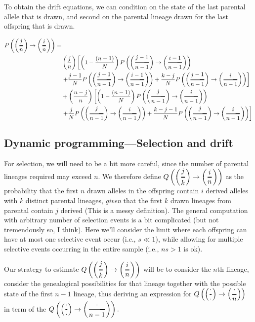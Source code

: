 \documentclass[]{article}
\newcommand{\Dfrac}[2]{%
  \ooalign{%
    $\left(\genfrac{}{}{1.2pt}0{#1}{#2}\right)$\cr%
    $\color{white}\genfrac{}{}{.4pt}0{\phantom{#1}}{\phantom{#2}}$}%
}
\begin{document}
To obtain the drift equations, we can condition on the state of the last parental allele that is drawn, and second on the parental lineage drawn for the last offspring that is drawn. 

\begin{equation}
\begin{split}
 P\left(\Dfrac{j}{n} \rightarrow \Dfrac{i}{n} \right) =&\\& \left(\frac{j}{n}\right)\left[ \left(1-\frac{(n-1)}{N}\right) P\left(\Dfrac{j-1}{n-1} \rightarrow \Dfrac{i-1}{n-1} \right) \right. \\&
 \left.+ \frac{j-1}{N} P\left(\Dfrac{j-1}{n-1} \rightarrow \Dfrac{i-1}{n-1} \right)  +     \frac{k-j}{N} P\left(\Dfrac{j-1}{n-1} \rightarrow \Dfrac{i}{n-1} \right)     \right]
 \\&
 + \left(\frac{n-j}{n}\right)\left[ \left(1-\frac{(n-1)}{N}\right) P\left(\Dfrac{j}{n-1} \rightarrow \Dfrac{i}{n-1} \right) 
 \right. \\&
 \left.+ \frac{j}{N} P\left(\Dfrac{j}{n-1} \rightarrow \Dfrac{i}{n-1} \right) +     \frac{k-j-1}{N} P\left(\Dfrac{j}{n-1} \rightarrow \Dfrac{i}{n-1} \right)     \right]
\end{split}
\end{equation}


\subsection{Dynamic programming---Selection and drift}

For selection, we will need to be a bit more careful, since the number of parental lineages required may exceed $n$. We therefore define $Q\left(\Dfrac{j}{k} \rightarrow \Dfrac{i}{n} \right)$ as the probability that the first $n$ drawn alleles in the offspring contain $i$ derived alleles with $k$ distinct parental lineages, \emph{given} that the first $k$ drawn lineages from parental contain $j$ derived (This is a messy definition). 
The general computation with arbitrary number of selection events is a bit complicated (but not tremendously so, I think). Here we'll consider the limit where each offspring can have at most one selective event occur (i.e., 
$s\ll 1$), while allowing for multiple selective events occurring in the entire sample (i.e., $ns>1$ is ok). 

Our strategy to estimate $Q\left(\Dfrac{j}{k} \rightarrow \Dfrac{i}{n} \right)$ will be to consider the $n$th lineage, consider the genealogical possibilities for that lineage together with the possible state of the first $n-1$ lineage, thus deriving an expression for $Q\left(\Dfrac{\cdot}{\cdot} \rightarrow \Dfrac{\cdot}{n} \right)$ in term of the $Q\left(\Dfrac{\cdot}{\cdot} \rightarrow \Dfrac{\cdot}{n-1} \right). $
\end{document}

